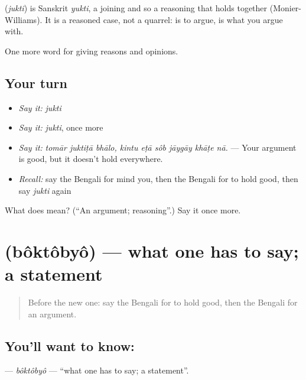 \begin{cousinweb}
\textbf{} (\emph{jukti}) is Sanskrit \emph{yukti}, a joining and so a reasoning that holds together (Monier-Williams). It is a reasoned case, not a quarrel:   is to argue,  is what you argue with.
\end{cousinweb}

\begin{grammarlens}[title={What you've built}]
One more word for giving reasons and opinions.
\end{grammarlens}

\subsection*{Your turn}
\begin{itemize}
\raggedright
  \item \emph{Say it:} \emph{jukti}
  \item \emph{Say it:} \emph{jukti}, once more
  \item \emph{Say it:} \emph{tomār juktiṭā bhālo, kintu eṭā sôb jāygāy khāṭe nā.} — Your argument is good, but it doesn't hold everywhere.
  \item \emph{Recall:} say the Bengali for mind you, then the Bengali for to hold good, then say \emph{jukti} again
\end{itemize}

\begin{tcolorbox}[breakable,colback=teal!4,colframe=teal!35!black,title={Before you move on}]
What does  mean? (\textquotedblleft{}An argument; reasoning\textquotedblright{}.) Say it once more.
\end{tcolorbox}
\section[\texorpdfstring{\bn{বক্তব্য} (bôktôbyô)}{বক্তব্য (bôktôbyô)}]{ (bôktôbyô) — what one has to say; a statement}

\label{lesson:BN-C333-boktobyo}



\begin{quote}
Before the new one: say the Bengali for to hold good, then the Bengali for an argument.
\end{quote}

\subsection*{You'll want to know: }
\textbf{} — \emph{bôktôbyô} — \textquotedblleft{}what one has to say; a statement\textquotedblright{}.

